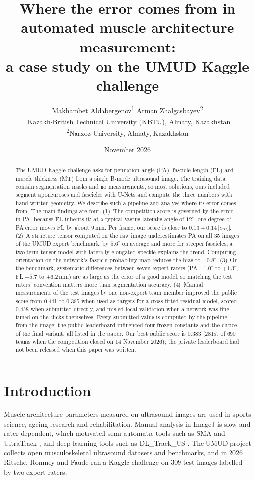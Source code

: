 \documentclass[11pt,a4paper]{article}
\title{Where the error comes from in automated muscle architecture measurement:\\ a case study on the UMUD Kaggle challenge}
\author{Makhambet Aldabergenov\textsuperscript{1} \qquad Arman Zhalgasbayev\textsuperscript{2}\\[6pt]
\small \textsuperscript{1}Kazakh-British Technical University (KBTU), Almaty, Kazakhstan\\
\small \textsuperscript{2}Narxoz University, Almaty, Kazakhstan}
\date{November 2026}
\newcommand{\PA}{\mathrm{PA}}
\begin{document}
\maketitle

\begin{abstract}
The UMUD Kaggle challenge asks for pennation angle (PA), fascicle length (FL) and muscle thickness (MT) from a single B-mode ultrasound image. The training data contain segmentation masks and no measurements, so most solutions, ours included, segment aponeuroses and fascicles with U-Nets and compute the three numbers with hand-written geometry. We describe such a pipeline and analyse where its error comes from. The main findings are four. (1)~The competition score is governed by the error in PA, because FL inherits it: at a typical vastus lateralis angle of $12^\circ$, one degree of PA error moves FL by about 9\,mm. Per frame, our score is close to $0.13 + 0.14\,|e_\PA|$. (2)~A structure tensor computed on the raw image underestimates PA on all 35 images of the UMUD expert benchmark, by $5.6^\circ$ on average and more for steeper fascicles; a two-term tensor model with laterally elongated speckle explains the trend. Computing orientation on the network's fascicle probability map reduces the bias to $-0.8^\circ$. (3)~On the benchmark, systematic differences between seven expert raters (PA $-1.0^\circ$ to $+1.3^\circ$, FL $-5.7$ to $+6.2$\,mm) are as large as the error of a good model, so matching the test raters' convention matters more than segmentation accuracy. (4)~Manual measurements of the test images by one non-expert team member improved the public score from 0.441 to 0.385 when used as targets for a cross-fitted residual model, scored 0.458 when submitted directly, and misled local validation when a network was fine-tuned on the clicks themselves. Every submitted value is computed by the pipeline from the image; the public leaderboard influenced four frozen constants and the choice of the final variant, all listed in the paper. Our best public score is 0.383 (281st of 690 teams when the competition closed on 14 November 2026); the private leaderboard had not been released when this paper was written.
\end{abstract}

\section{Introduction}

Muscle architecture parameters measured on ultrasound images are used in sports science, ageing research and rehabilitation. Manual analysis in ImageJ is slow and rater dependent, which motivated semi-automatic tools such as SMA \citep{seynnes2020sma} and UltraTrack \citep{farris2016ultratrack}, and deep-learning tools such as DL\_Track\_US \citep{cronin2020dl,ritsche2023dltrack}. The UMUD project \citep{ritsche2026umud} collects open musculoskeletal ultrasound datasets and benchmarks, and in 2026 Ritsche, Romney and Faude ran a Kaggle challenge \citep{ritsche2026challenge} on 309 test images labelled by two expert raters.
\end{document}
